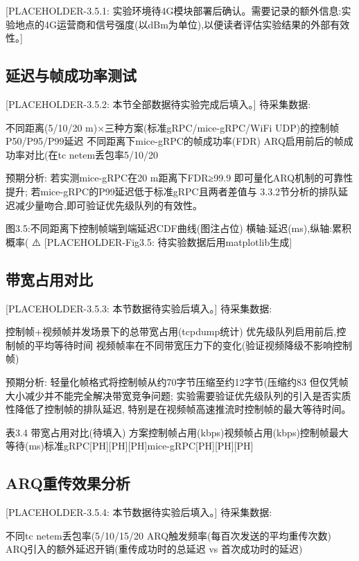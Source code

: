 [PLACEHOLDER-3.5.1: 实验环境待4G模块部署后确认。需要记录的额外信息:实验地点的4G运营商和信号强度(以dBm为单位),以便读者评估实验结果的外部有效性。]

\subsection{延迟与帧成功率测试}

[PLACEHOLDER-3.5.2: 本节全部数据待实验完成后填入。]
待采集数据:

不同距离(5/10/20 m)×三种方案(标准gRPC/mice-gRPC/WiFi UDP)的控制帧P50/P95/P99延迟
不同距离下mice-gRPC的帧成功率(FDR)
ARQ启用前后的帧成功率对比(在tc netem丢包率5/10/20%

预期分析:
若实测mice-gRPC在20 m距离下FDR≥99.9%
即可量化ARQ机制的可靠性提升;
若mice-gRPC的P99延迟低于标准gRPC且两者差值与
3.3.2节分析的排队延迟减少量吻合,即可验证优先级队列的有效性。


图3.5:不同距离下控制帧端到端延迟CDF曲线(图注占位)
横轴:延迟(ms),纵轴:累积概率(%
⚠️ [PLACEHOLDER-Fig3.5: 待实验数据后用matplotlib生成]

\subsection{带宽占用对比}

[PLACEHOLDER-3.5.3: 本节数据待实验后填入。]
待采集数据:

控制帧+视频帧并发场景下的总带宽占用(tcpdump统计)
优先级队列启用前后,控制帧的平均等待时间
视频帧率在不同带宽压力下的变化(验证视频降级不影响控制帧)

预期分析:
轻量化帧格式将控制帧从约70字节压缩至约12字节(压缩约83%
但仅凭帧大小减少并不能完全解决带宽竞争问题;
实验需要验证优先级队列的引入是否实质性降低了控制帧的排队延迟,
特别是在视频帧高速推流时控制帧的最大等待时间。

表3.4 带宽占用对比(待填入)
方案控制帧占用(kbps)视频帧占用(kbps)控制帧最大等待(ms)标准gRPC[PH][PH][PH]mice-gRPC[PH][PH][PH]

\subsection{ARQ重传效果分析}

[PLACEHOLDER-3.5.4: 本节数据待实验后填入。]
待采集数据:

不同tc netem丢包率(5/10/15/20%
ARQ触发频率(每百次发送的平均重传次数)
ARQ引入的额外延迟开销(重传成功时的总延迟 vs 首次成功时的延迟)

